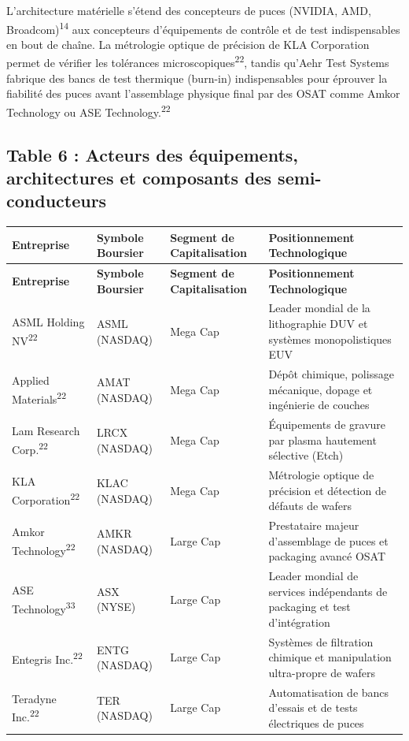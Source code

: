 \documentclass[11pt,a4paper]{article}
\begin{document}
L'architecture matérielle s'étend des concepteurs de puces (NVIDIA, AMD, Broadcom)\textsuperscript{14} aux concepteurs d'équipements de contrôle et de test indispensables en bout de chaîne. La métrologie optique de précision de KLA Corporation permet de vérifier les tolérances microscopiques\textsuperscript{22}, tandis qu'Aehr Test Systems fabrique des bancs de test thermique (burn-in) indispensables pour éprouver la fiabilité des puces avant l'assemblage physique final par des OSAT comme Amkor Technology ou ASE Technology.\textsuperscript{22}

\subsection*{Table 6 : Acteurs des équipements, architectures et composants des semi-conducteurs}
\begin{longtable}{p{3cm} p{3.5cm} p{3cm} p{5cm}}
\toprule
\textbf{Entreprise} & \textbf{Symbole Boursier} & \textbf{Segment de Capitalisation} & \textbf{Positionnement Technologique} \\
\midrule
\endfirsthead
\toprule
\textbf{Entreprise} & \textbf{Symbole Boursier} & \textbf{Segment de Capitalisation} & \textbf{Positionnement Technologique} \\
\midrule
\endhead
ASML Holding NV\textsuperscript{22} & ASML (NASDAQ) & Mega Cap & Leader mondial de la lithographie DUV et systèmes monopolistiques EUV \\
Applied Materials\textsuperscript{22} & AMAT (NASDAQ) & Mega Cap & Dépôt chimique, polissage mécanique, dopage et ingénierie de couches \\
Lam Research Corp.\textsuperscript{22} & LRCX (NASDAQ) & Mega Cap & Équipements de gravure par plasma hautement sélective (Etch) \\
KLA Corporation\textsuperscript{22} & KLAC (NASDAQ) & Mega Cap & Métrologie optique de précision et détection de défauts de wafers \\
Amkor Technology\textsuperscript{22} & AMKR (NASDAQ) & Large Cap & Prestataire majeur d'assemblage de puces et packaging avancé OSAT \\
ASE Technology\textsuperscript{33} & ASX (NYSE) & Large Cap & Leader mondial de services indépendants de packaging et test d'intégration \\
Entegris Inc.\textsuperscript{22} & ENTG (NASDAQ) & Large Cap & Systèmes de filtration chimique et manipulation ultra-propre de wafers \\
Teradyne Inc.\textsuperscript{22} & TER (NASDAQ) & Large Cap & Automatisation de bancs d'essais et de tests électriques de puces \\

\end{longtable}
\end{document}
